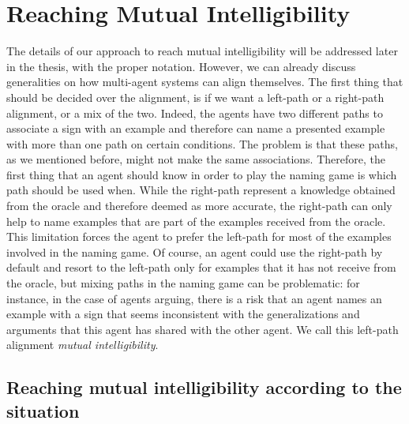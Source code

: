\section{Reaching Mutual Intelligibility}

The details of our approach to reach mutual intelligibility will be addressed later in the thesis, with the proper notation. However, we can already discuss generalities on how multi-agent systems can align themselves.
The first thing that should be decided over the alignment, is if we want a left-path or a right-path alignment, or a mix of the two. Indeed, the agents have two different paths to associate a sign with an example and therefore can name a presented example with more than one path on certain conditions. The problem is that these paths, as we mentioned before, might not make the same associations. Therefore, the first thing that an agent should know in order to play the naming game is which path should be used when. While the right-path represent a knowledge obtained from the oracle and therefore deemed as more accurate, the right-path can only help to name examples that are part of the examples received from the oracle. This limitation forces the agent to prefer the left-path for most of the examples involved in the naming game. Of course, an agent could use the right-path by default and resort to the left-path only for examples that it has not receive from the oracle, but mixing paths in the naming game can be problematic: for instance, in the case of agents arguing, there is a risk that an agent names an example with a sign that seems inconsistent with the generalizations and arguments that this agent has shared with the other agent. We call this left-path alignment \emph{mutual intelligibility}.

\subsection{Reaching mutual intelligibility according to the situation}


